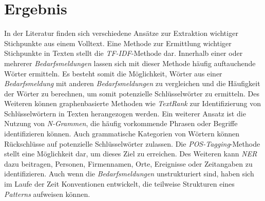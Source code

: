 \section{Ergebnis}
In der Literatur finden sich verschiedene Ansätze zur Extraktion wichtiger Stichpunkte aus einem Volltext. Eine Methode zur Ermittlung wichtiger Stichpunkte in Texten stellt die \emph{TF-IDF}-Methode dar. Innerhalb einer oder mehrerer \emph{Bedarfsmeldungen} lassen sich mit dieser Methode häufig auftauchende Wörter ermitteln. Es besteht somit die Möglichkeit, Wörter aus einer \emph{Bedarfsmeldung} mit anderen \emph{Bedarfsmeldungen} zu vergleichen und die Häufigkeit der Wörter zu berechnen, um somit potenzielle Schlüsselwörter zu ermitteln. Des Weiteren können graphenbasierte Methoden wie \emph{TextRank} zur Identifizierung von Schlüsselwörtern in Texten herangezogen werden. Ein weiterer Ansatz ist die Nutzung von \emph{N-Grammen}, die häufig vorkommende Phrasen oder Begriffe identifizieren können. Auch grammatische Kategorien von Wörtern können Rückschlüsse auf potenzielle Schlüsselwörter zulassen. Die \emph{POS-Tagging}-Methode stellt eine Möglichkeit dar, um dieses Ziel zu erreichen. Des Weiteren kann \emph{NER} dazu beitragen, Personen, Firmennamen, Orte, Ereignisse oder Zeitangaben zu identifizieren. Auch wenn die \emph{Bedarfsmeldungen} unstrukturiert sind, haben sich im Laufe der Zeit Konventionen entwickelt, die teilweise Strukturen eines \emph{Patterns} aufweisen können.\\




\newpage





